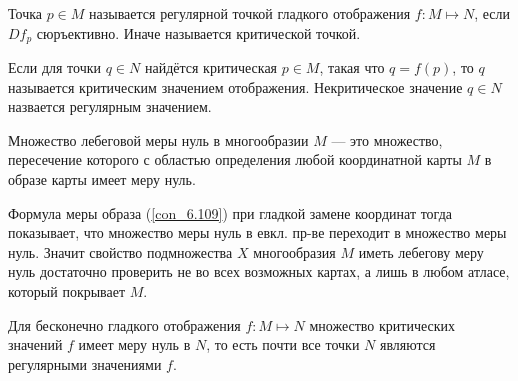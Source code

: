 \begin{to_def}
	Точка $p \in M$ называется регулярной точкой гладкого отображения $f \colon M \mapsto N$, если $D f_{p}$ сюръективно. Иначе называется критической точкой.

	Если для точки $q \in N$ найдётся критическая $p \in M$, такая что $q = f(p)$, то $q$ называется критическим значением отображения. Некритическое значение $q \in N$ назвается регулярным значением.
\end{to_def}

\begin{to_def}
	Множество лебеговой меры нуль в многообразии $M$ --- это множество, пересечение которого с областью определения любой координатной карты $M$ в образе карты имеет меру нуль.
\end{to_def}

Формула меры образа (\ref{con_6.109}) при гладкой замене координат тогда показывает, что множество меры нуль в евкл. пр-ве переходит в множество меры нуль. Значит свойство подмножества $X$ многообразия $M$ иметь лебегову меру нуль достаточно проверить не во всех возможных картах, а лишь в любом атласе, который покрывает $M$.

\begin{to_thr}
	Для бесконечно гладкого отображения $f \colon M \mapsto N$ множество критических значений $f$ имеет меру нуль в $N$, то есть почти все точки $N$ являются регулярными значениями $f$.
\end{to_thr}